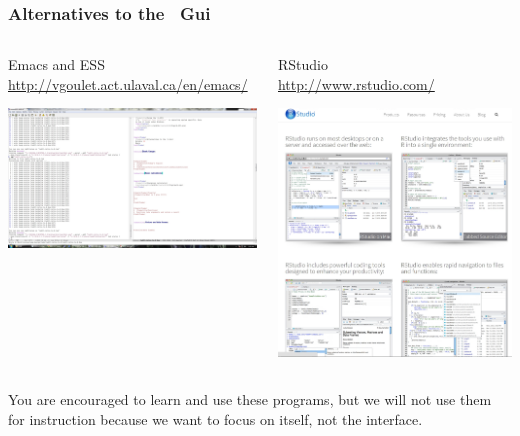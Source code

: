 \documentclass[color=usenames,dvipsnames]{beamer}\usepackage[]{graphicx}\usepackage[]{color}
\begin{document}
\begin{frame}
  \frametitle{Alternatives to the \R~Gui}
  \begin{columns}
    \small
    \begin{column}{0.6\textwidth}
      \centering
      Emacs and ESS \\ \tiny
      \url{http://vgoulet.act.ulaval.ca/en/emacs/} \par
      \includegraphics[width=\textwidth]{figs/emacs}
    \end{column}
    \begin{column}{0.4\textwidth}
      \centering
      RStudio \\
      \url{http://www.rstudio.com/} \par
      \includegraphics[width=\textwidth]{figs/Rstudio}
    \end{column}
  \end{columns}
  \small
  \vspace{0.5cm}
  You are encouraged to learn and use these programs, but we will not
  use them for instruction because we want to focus on \R itself, not
  the interface.
\end{frame}
\end{document}
